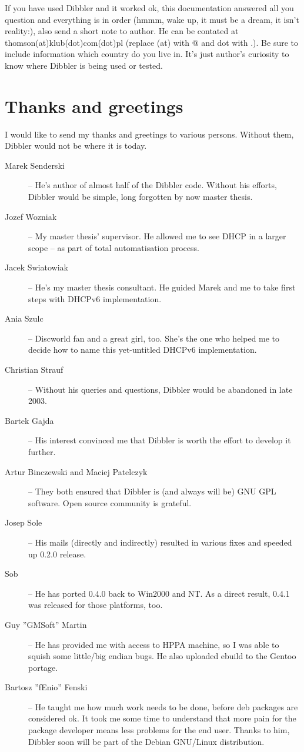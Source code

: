 If you have used Dibbler and it worked ok, this documentation answered
all you question and everything is in order (hmmm, wake up, it must be
a dream, it isn't reality:), also send a short note to author. He can
be contated at thomson(at)klub(dot)com(dot)pl (replace (at) with @ and
dot with .). Be sure to include information which country do you live
in. It's just author's curiosity to know where Dibbler is being used
or tested.

\section{Thanks and greetings}

I would like to send my thanks and greetings to various persons.
Without them, Dibbler would not be where it is today.
\begin{description}
\item[Marek Senderski] -- He's author of almost half of the Dibbler
  code. Without his efforts, Dibbler would be simple, long forgotten
  by now master thesis.
\item[Jozef Wozniak] -- My master thesis' supervisor. He allowed me to
  see DHCP in a larger scope -- as part of total automatisation process.
\item[Jacek Swiatowiak] -- He's my master thesis consultant. He guided 
  Marek and me to take first steps with DHCPv6 implementation.
\item[Ania Szulc] -- Discworld fan and a great girl, too. She's the one
  who helped me to decide how to name this yet-untitled DHCPv6 implementation.
\item[Christian Strauf] -- Without his queries and questions, Dibbler
  would be abandoned in late 2003.
\item[Bartek Gajda] -- His interest convinced me that Dibbler is worth
  the effort to develop it further.
\item[Artur Binczewski and Maciej Patelczyk] -- They both ensured that
  Dibbler is (and always will be) GNU GPL software. Open source
  community is grateful.
\item[Josep Sole] -- His mails (directly and indirectly) resulted in
  various fixes and speeded up 0.2.0 release.
\item[Sob] -- He has ported 0.4.0 back to Win2000 and NT. As a direct
  result, 0.4.1 was released for those platforms, too.
\item[Guy ''GMSoft'' Martin] -- He has provided me with access to HPPA machine,
  so I was able to squish some little/big endian bugs. He also uploaded
  ebuild to the Gentoo portage.
\item[Bartosz ''fEnio'' Fenski] -- He taught me how much work needs to be done,
  before deb packages are considered ok. It took me some time to understand that 
  more pain for the package developer means less problems for the end user. 
  Thanks to him, Dibbler soon will be part of the Debian GNU/Linux distribution.
\end{description}
